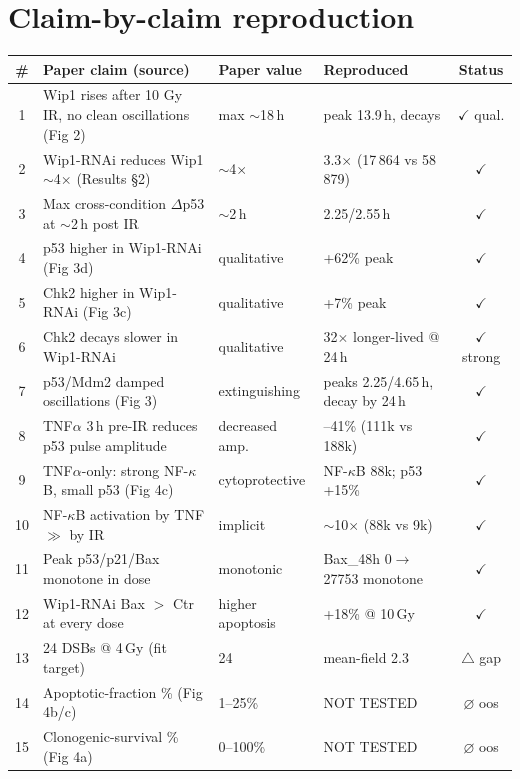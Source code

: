 \documentclass[11pt]{article}
\begin{document}
\section{Claim-by-claim reproduction}
\begin{longtable}{clp{3.5cm}p{3.5cm}c}
\toprule
\# & Paper claim (source) & Paper value & Reproduced & Status \\
\midrule
1 & Wip1 rises after 10 Gy IR, no clean oscillations (Fig 2) & max $\sim$18\,h & peak 13.9\,h, decays & $\checkmark$ qual. \\
2 & Wip1-RNAi reduces Wip1 $\sim$4$\times$ (Results \S2) & $\sim$4$\times$ & 3.3$\times$ (17\,864 vs 58\,879) & $\checkmark$ \\
3 & Max cross-condition $\Delta$p53 at $\sim$2\,h post IR & $\sim$2\,h & 2.25/2.55\,h & $\checkmark$ \\
4 & p53 higher in Wip1-RNAi (Fig 3d) & qualitative & +62\% peak & $\checkmark$ \\
5 & Chk2 higher in Wip1-RNAi (Fig 3c) & qualitative & +7\% peak & $\checkmark$ \\
6 & Chk2 decays slower in Wip1-RNAi & qualitative & 32$\times$ longer-lived @ 24\,h & $\checkmark$ strong \\
7 & p53/Mdm2 damped oscillations (Fig 3) & extinguishing & peaks 2.25/4.65\,h, decay by 24\,h & $\checkmark$ \\
8 & TNF$\alpha$ 3\,h pre-IR reduces p53 pulse amplitude & decreased amp. & --41\% (111k vs 188k) & $\checkmark$ \\
9 & TNF$\alpha$-only: strong NF-$\kappa$B, small p53 (Fig 4c) & cytoprotective & NF-$\kappa$B 88k; p53 +15\% & $\checkmark$ \\
10 & NF-$\kappa$B activation by TNF $\gg$ by IR & implicit & $\sim$10$\times$ (88k vs 9k) & $\checkmark$ \\
11 & Peak p53/p21/Bax monotone in dose & monotonic & Bax\_48h 0$\to$27753 monotone & $\checkmark$ \\
12 & Wip1-RNAi Bax $>$ Ctr at every dose & higher apoptosis & +18\% @ 10\,Gy & $\checkmark$ \\
13 & 24 DSBs @ 4\,Gy (fit target) & 24 & mean-field 2.3 & $\triangle$ gap \\
14 & Apoptotic-fraction \% (Fig 4b/c) & 1--25\% & NOT TESTED & \color{red}$\varnothing$ oos \\
15 & Clonogenic-survival \% (Fig 4a) & 0--100\% & NOT TESTED & \color{red}$\varnothing$ oos \\
\bottomrule
\end{longtable}
\end{document}
